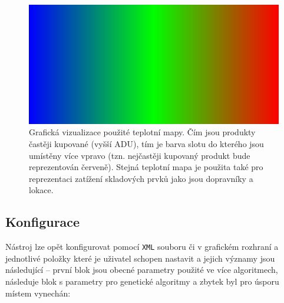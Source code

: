 \addtocounter{footnote}{-1}

\begin{figure}[t]
    \centering
    \includegraphics[width=0.5\linewidth]{figures/implementace/heatmapOptimizer.png}
    \caption{Grafická vizualizace použité teplotní mapy. Čím jsou produkty častěji kupované (vyšší ADU), tím je barva slotu do kterého jsou umístěny více vpravo (tzn. nejčastěji kupovaný produkt bude reprezentován červeně). Stejná teplotní mapa je použita také pro reprezentaci zatížení skladových prvků jako jsou dopravníky a lokace\protect\footnotemark{}.}
    \label{fig:heatmap}
\end{figure}


\subsection{Konfigurace}
Nástroj lze opět konfigurovat pomocí \texttt{XML} souboru či v grafickém rozhraní a jednotlivé položky které je uživatel schopen nastavit a jejich významy jsou následující -- první blok jsou obecné parametry použité ve více algoritmech, následuje blok s parametry pro genetické algoritmy a zbytek byl pro úsporu místem vynechán:

